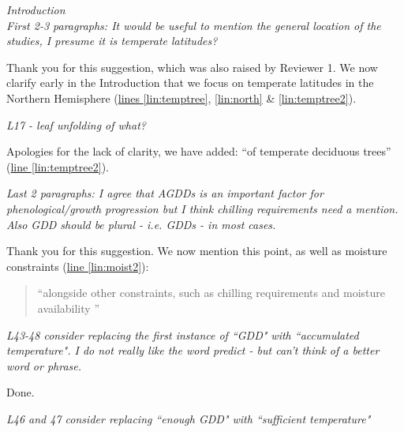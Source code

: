 \documentclass[11pt,letter]{article}
\begin{document}
\begin{mybox}
\emph{Introduction \\
First 2-3 paragraphs: It would be useful to mention the general location of the studies, I presume it is temperate latitudes?}
\end{mybox}

Thank you for this suggestion, which was also raised by Reviewer 1. We now clarify early in the Introduction that we focus on temperate latitudes in the Northern Hemisphere (\href{file:synchrony_r1\#lintarget:temptree}{lines \ref*{lin:temptree}}, \href{file:synchrony_r1\#lintarget:north}{\ref*{lin:north}} \& \href{file:synchrony_r1\#lintarget:temptree2}{\ref*{lin:temptree2}}). \\ 

\begin{mybox}
\emph{L17 - leaf unfolding of what?}
\end{mybox}

Apologies for the lack of clarity, we have added: ``of temperate deciduous trees'' (\href{file:synchrony_r1\#lintarget:temptree2}{line \ref*{lin:temptree2}}).\\

\begin{mybox}
\emph{Last 2 paragraphs: I agree that AGDDs is an important factor for phenological/growth progression but I think chilling requirements need a mention. Also GDD should be plural - i.e. GDDs - in most cases.}
\end{mybox}

Thank you for this suggestion. We now mention this point, as well as moisture constraints (\href{file:synchrony_r1\#lintarget:moist2}{line \ref*{lin:moist2}}):
\begin{quote}
    ``alongside other constraints, such as chilling requirements \citep{Chuine2017} and moisture availability \citep{Garonna2018}''
\end{quote}

\begin{mybox}
\emph{L43-48 consider replacing the first instance of ``GDD" with ``accumulated temperature". I do not really like the word predict - but can't think of a better word or phrase.}
\end{mybox}

Done. \\

\begin{mybox}
\emph{L46 and 47 consider replacing ``enough GDD" with ``sufficient temperature"}
\end{mybox}
\end{document}

